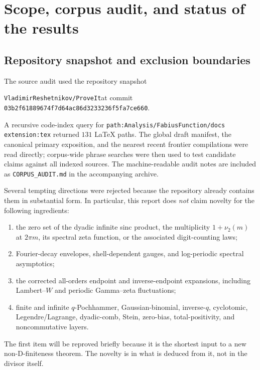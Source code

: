 \documentclass[11pt]{article}
\numberwithin{equation}{section}
\theoremstyle{definition}
\theoremstyle{remark}
\begin{document}
\tableofcontents
\newpage

\section{Scope, corpus audit, and status of the results}
\label{sec:audit}

\subsection{Repository snapshot and exclusion boundaries}

The source audit used the repository snapshot
\begin{center}
\small\texttt{VladimirReshetnikov/ProveIt}\quad at commit\quad
\texttt{03b2f61889674f7d64ac86d3233236f5fa7ce660}.
\end{center}
A recursive code-index query for
\texttt{path:Analysis/FabiusFunction/docs extension:tex} returned $131$ LaTeX
paths.  The global draft manifest, the canonical primary exposition, and the
nearest recent frontier compilations were read directly; corpus-wide phrase
searches were then used to test candidate claims against all indexed sources.
The machine-readable audit notes are included as \texttt{CORPUS\_AUDIT.md} in
the accompanying archive.

Several tempting directions were rejected because the repository already
contains them in substantial form.  In particular, this report does \emph{not}
claim novelty for the following ingredients:
\begin{enumerate}[label=(\roman*)]
  \item the zero set of the dyadic infinite sinc product, the multiplicity
        $1+\nu_2(m)$ at $2\pi m$, its spectral zeta function, or the associated
        digit-counting laws;
  \item Fourier-decay envelopes, shell-dependent gauges, and log-periodic
        spectral asymptotics;
  \item the corrected all-orders endpoint and inverse-endpoint expansions,
        including Lambert--$W$ and periodic Gamma--zeta fluctuations;
  \item finite and infinite $q$-Pochhammer, Gaussian-binomial, inverse-$q$,
        cyclotomic, Legendre/Lagrange, dyadic-comb, Stein, zero-bias,
        total-positivity, and noncommutative layers.
\end{enumerate}
The first item will be reproved briefly because it is the shortest input to a
new non-D-finiteness theorem.  The novelty is in what is deduced from it, not in
the divisor itself.
\end{document}
